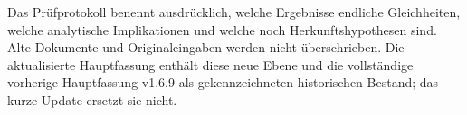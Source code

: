 Das Prüfprotokoll benennt ausdrücklich, welche Ergebnisse endliche
Gleichheiten, welche analytische Implikationen und welche noch
Herkunftshypothesen sind. Alte Dokumente und Originaleingaben werden
nicht überschrieben. Die aktualisierte Hauptfassung enthält diese neue
Ebene und die vollständige vorherige Hauptfassung v1.6.9 als
gekennzeichneten historischen Bestand; das kurze Update ersetzt sie
nicht.

